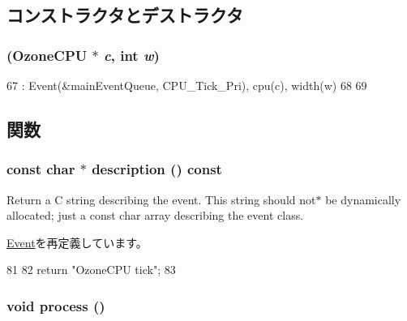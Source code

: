 \subsection{コンストラクタとデストラクタ}
\hypertarget{structOzoneCPU_1_1TickEvent_adb7ce54f621129f1b65634eb64fdbf26}{
\subsubsection[{TickEvent}]{ ({\bf OzoneCPU} $\ast$ {\em c}, \/  int {\em w})}}
\label{structOzoneCPU_1_1TickEvent_adb7ce54f621129f1b65634eb64fdbf26}



\begin{DoxyCode}
67     : Event(&mainEventQueue, CPU_Tick_Pri), cpu(c), width(w)
68 {
69 }
\end{DoxyCode}


\subsection{関数}
\hypertarget{structOzoneCPU_1_1TickEvent_a5a14fe478e2393ff51f02e9b7be27e00}{
\subsubsection[{description}]{\setlength{\rightskip}{0pt plus 5cm}const char $\ast$ description () const}}
\label{structOzoneCPU_1_1TickEvent_a5a14fe478e2393ff51f02e9b7be27e00}
Return a C string describing the event. This string should not$\ast$ be dynamically allocated; just a const char array describing the event class. 

\hyperlink{classEvent_a130ddddf003422b413e2e891b1b80e8f}{Event}を再定義しています。


\begin{DoxyCode}
81 {
82     return "OzoneCPU tick";
83 }
\end{DoxyCode}
\hypertarget{structOzoneCPU_1_1TickEvent_a2e9c5136d19b1a95fc427e0852deab5c}{
\subsubsection[{process}]{\setlength{\rightskip}{0pt plus 5cm}void process ()}}
\label{structOzoneCPU_1_1TickEvent_a2e9c5136d19b1a95fc427e0852deab5c}



